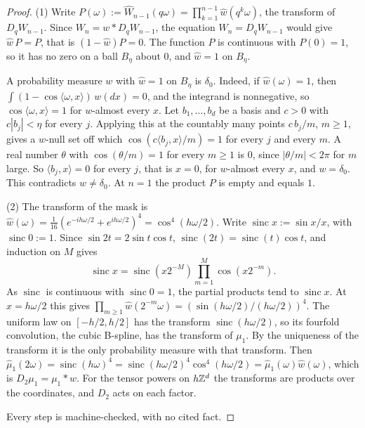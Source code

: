 \begin{proof}
(1) Write $P(\omega) := \widehat W_{n-1}(q\omega) = \prod_{k=1}^{n-1}\widehat w(q^k\omega)$, the
transform of $D_qW_{n-1}$. Since $W_n = w * D_qW_{n-1}$, the equation $W_n = D_qW_{n-1}$ would give
$\widehat w\,P = P$, that is $(1 - \widehat w)P = 0$. The function $P$ is continuous with
$P(0) = 1$, so it has no zero on a ball $B_\eta$ about $0$, and $\widehat w = 1$ on $B_\eta$.

A probability measure $w$ with $\widehat w = 1$ on $B_\eta$ is $\delta_0$. Indeed, if
$\widehat w(\omega) = 1$, then $\int(1 - \cos\langle\omega, x\rangle)\,w(dx) = 0$, and the integrand
is nonnegative, so $\cos\langle\omega, x\rangle = 1$ for $w$-almost every $x$. Let $b_1, \dots, b_d$
be a basis and $c > 0$ with $c|b_j| < \eta$ for every $j$. Applying this at the countably many points
$c\,b_j/m$, $m \ge 1$, gives a $w$-null set off which $\cos(c\langle b_j, x\rangle/m) = 1$ for every
$j$ and every $m$. A real number $\theta$ with $\cos(\theta/m) = 1$ for every $m \ge 1$ is $0$,
since $|\theta/m| < 2\pi$ for $m$ large. So $\langle b_j, x\rangle = 0$ for every $j$, that is $x = 0$,
for $w$-almost every $x$, and $w = \delta_0$. This contradicts $w \ne \delta_0$. At $n = 1$ the
product $P$ is empty and equals $1$.

(2) The transform of the mask is
$\widehat w(\omega) = \tfrac1{16}(e^{-ih\omega/2} + e^{ih\omega/2})^4 = \cos^4(h\omega/2)$. Write
$\operatorname{sinc} x := \sin x/x$, with $\operatorname{sinc} 0 := 1$. Since
$\sin 2t = 2\sin t\cos t$, $\operatorname{sinc}(2t) = \operatorname{sinc}(t)\cos t$, and induction
on $M$ gives
\[
  \operatorname{sinc} x = \operatorname{sinc}(x2^{-M})\prod_{m=1}^{M}\cos(x2^{-m}) .
\]
As $\operatorname{sinc}$ is continuous with $\operatorname{sinc} 0 = 1$, the partial products tend
to $\operatorname{sinc} x$. At $x = h\omega/2$ this gives
$\prod_{m \ge 1}\widehat w(2^{-m}\omega) = (\sin(h\omega/2)/(h\omega/2))^4$. The uniform law on
$[-h/2, h/2]$ has the transform $\operatorname{sinc}(h\omega/2)$, so its fourfold convolution, the
cubic B-spline, has the transform of $\mu_1$. By the uniqueness of the transform it is the only
probability measure with that transform. Then
$\widehat\mu_1(2\omega) = \operatorname{sinc}(h\omega)^4
= \operatorname{sinc}(h\omega/2)^4\cos^4(h\omega/2) = \widehat\mu_1(\omega)\widehat w(\omega)$,
which is $D_2\mu_1 = \mu_1 * w$. For the tensor powers on $h\mathbb{Z}^d$ the transforms are products over
the coordinates, and $D_2$ acts on each factor.

Every step is machine-checked, with no cited fact.
\end{proof}

